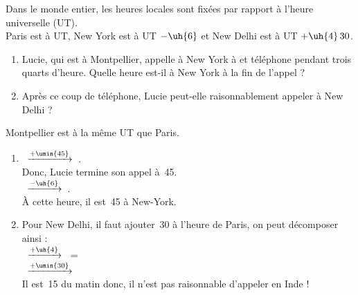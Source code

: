 \begin{exercice*}
   Dans le monde entier, les heures locales sont fixées par rapport à l'heure universelle (UT). \\
   Paris est à UT, New York est à UT $-\uh{6}$ et New Delhi est à UT $+\uh{4}\,30$.
   \begin{enumerate}
      \item Lucie, qui est à Montpellier, appelle à New York à  et téléphone pendant trois quarts d'heure. Quelle heure est-il à New York à la fin de l'appel ?
      \item Après ce coup de téléphone, Lucie peut-elle raisonnablement appeler à New Delhi ?
   \end{enumerate}
\end{exercice*}

\begin{corrige}
   Montpellier est à la même UT que Paris. \\
   \begin{enumerate}
      \item {}\, \quad $\xrightarrow{+\umin{45}}$ \quad {}\,. \\
         Donc, Lucie termine son appel à \,45. \\ [1mm]
         \, \quad $\xrightarrow{-\uh{6}}$ \quad {}\,. \\
         À cette heure, il est {\red {}\,45} à New-York.
      \item Pour New Delhi, il faut ajouter \,30 à l'heure de Paris, on peut décomposer ainsi : \\ [1mm]
         \, \quad $\xrightarrow{+\uh{4}}$ \quad {}\, = \,\\ [1mm]
         \, \quad $\xrightarrow{+\umin{30}}$ \quad {}\, \\ [1mm]
         Il est \,15 du matin donc, {\red il n'est pas raisonnable d'appeler en Inde !}
   \end{enumerate}
\end{corrige}

